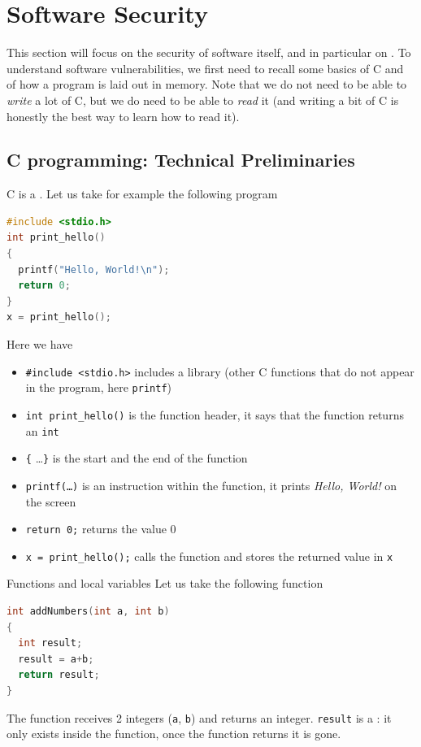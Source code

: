 \section{Software Security}
This section will focus on the security of software itself, and in particular on . To understand software vulnerabilities, we first need to recall some basics of C and of how a program is laid out in memory. Note that we do not need to be able to \textit{write} a lot of C, but we do need to be able to \textit{read} it (and writing a bit of C is honestly the best way to learn how to read it).

\subsection{C programming: Technical Preliminaries}
C is a . Let us take for example the following program
\begin{lstlisting}[language=C]
#include <stdio.h>
int print_hello()
{
  printf("Hello, World!\n");
  return 0;
}
x = print_hello();
\end{lstlisting}
Here we have
\begin{itemize}
    \item \texttt{\#include <stdio.h>} includes a library (other C functions that do not appear in the program, here \texttt{printf})
    \item \texttt{int print\_hello()} is the function header, it says that the function returns an \texttt{int}
    \item \texttt{\{} \dots \texttt{\}} is the start and the end of the function
    \item \texttt{printf(\dots)} is an instruction within the function, it prints \textit{Hello, World!} on the screen
    \item \texttt{return 0;} returns the value 0
    \item \texttt{x = print\_hello();} calls the function and stores the returned value in \texttt{x}
\end{itemize}

\begin{parag}{Functions and local variables}
    Let us take the following function
    \begin{lstlisting}[language=C]
int addNumbers(int a, int b)
{
  int result;
  result = a+b;
  return result;
}
    \end{lstlisting}
    The function receives 2 integers (\texttt{a}, \texttt{b}) and returns an integer. \texttt{result} is a : it only exists inside the function, once the function returns it is gone.
\end{parag}

